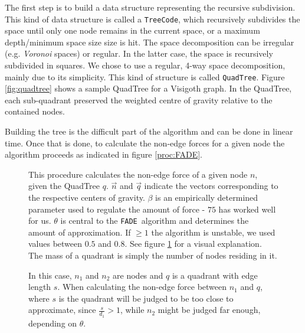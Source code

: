 \documentclass[a4paper,11pt,titlepage]{article}
\newcommand{\FADE}{\texttt{FADE}\ }
\newcommand{\code}[1]{\texttt{#1}}
\begin{document}
The first step is to build a data structure representing the recursive
subdivision. This kind of data structure is called a \code{TreeCode},
which recursively subdivides the space until only one node remains in
the current space, or a maximum depth/minimum space size size is
hit. The space decomposition can be irregular (e.g. \emph{Voronoi}
spaces) or regular. In the latter case, the space is recursively
subdivided in squares. We chose to use a regular, 4-way space
decomposition, mainly due to its simplicity. This kind of structure is
called \code{QuadTree}. Figure \ref{fig:quadtree} shows a sample
QuadTree for a Visigoth graph. In the QuadTree, each sub-quadrant
preserved the weighted centre of gravity relative to the contained
nodes.

Building the tree is the difficult part of the algorithm and can be
done in linear time.  Once that is done, to calculate the non-edge
forces for a given node the algorithm proceeds as indicated in figure
\ref{proc:FADE}.

\begin{figure}[ht]
  \begin{minipage}[b]{0.5\linewidth}
    
    \caption{This procedure calculates the non-edge force of a given
      node \(n\), given the QuadTree \(q\). \(\vec{n}\) and
      \(\vec{q}\) indicate the vectors corresponding to the respective
      centers of gravity. \(\beta\) is an empirically determined
      parameter used to regulate the amount of force - \(75\) has
      worked well for us. \(\theta\) is central to the \FADE algorithm
      and determines the amount of approximation. If \(\geq 1\) the
      algorithm is unstable, we used values between \(0.5\) and
      \(0.8\). See figure \ref{fig:theta} for a visual
      explanation. The mass of a quadrant is simply the number of
      nodes residing in it. }
    \label{proc:FADE}
  \end{minipage}
  \hspace{10pt}
  \begin{minipage}[b]{0.5\linewidth}
    \centering
    
    \caption{In this case, \(n_1\) and \(n_2\) are nodes and \(q\) is
      a quadrant with edge length \(s\). When calculating the non-edge
      force between \(n_1\) and \(q\), where \(s\) is the quadrant
      will be judged to be too close to approximate, since
      \(\frac{s}{d_1} > 1\), while \(n_2\) might be judged far enough,
      depending on \(\theta\).}
    \label{fig:theta}
  \end{minipage}
\end{figure}
\end{document}
